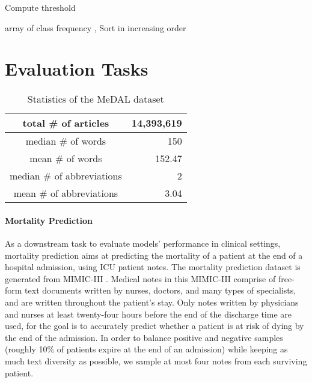 \documentclass[11pt,a4paper]{article}
\begin{document}
\begin{algorithm}
\caption{Compute threshold }
\begin{algorithmic}
\REQUIRE array of class frequency , 
\STATE Sort  in increasing order
\STATE 
\STATE 
{}
\STATE 
\STATE 
\STATE 
\IF{}
\RETURN 
\ENDIF
\ENDFOR
\end{algorithmic}
\label{alg:threshold}
\end{algorithm}

\section{Evaluation Tasks}\label{s:eval-task}

\begin{table}[tp]
\centering
\begin{tabular}{|c|r|}
\hline
total \# of articles & 14,393,619 \\ \hline
median \# of words & 150 \\ \hline
mean \# of words & 152.47 \\ \hline
median \# of abbreviations & 2 \\ \hline
mean \# of abbreviations & 3.04 \\ \hline
\end{tabular}
\caption{Statistics of the MeDAL dataset}
\label{tab:abb-dataset-stats}
\end{table}

\paragraph{Mortality Prediction}

As a downstream task to evaluate models' performance in clinical settings, mortality prediction aims at predicting the mortality of a patient at the end of a hospital admission, using ICU patient notes. The mortality prediction dataset is generated from MIMIC-III \citep{Johnson2016MIMIC-IIIDatabase}. Medical notes in this MIMIC-III comprise of free-form text documents written by nurses, doctors, and many types of specialists, and are written throughout the patient's stay. Only notes written by physicians and nurses at least twenty-four hours before the end of the discharge time are used, for the goal is to accurately predict whether a patient is at risk of dying by the end of the admission. In order to balance positive and negative samples (roughly 10\% of patients expire at the end of an admission) while keeping as much text diversity as possible, we sample at most four notes from each surviving patient. 
\end{document}
